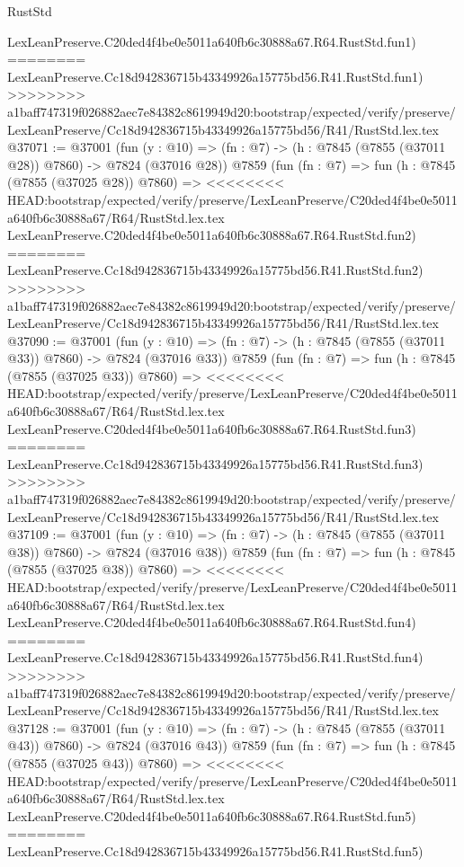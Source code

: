 \begin{lexlean}{RustStd}
\begin{coremodule}
{\begin{coremodule}
{{{{{{{{{{{{{{{{{{{{{{{{{{{{{{{{{{{{{{{{{{{{{{{{{{{{{{    LexLeanPreserve.C20ded4f4be0e5011a640fb6c30888a67.R64.RustStd.fun1)
========
    LexLeanPreserve.Cc18d942836715b43349926a15775bd56.R41.RustStd.fun1)
>>>>>>>> a1baff747319f026882aec7e84382c8619949d20:bootstrap/expected/verify/preserve/LexLeanPreserve/Cc18d942836715b43349926a15775bd56/R41/RustStd.lex.tex
@37071 := @37001
    (fun (y : @10) => (fn : @7) -> (h : @7845 (@7855 (@37011 @28)) @7860) -> @7824 (@37016 @28))
    @7859
    (fun (fn : @7) =>
    fun (h : @7845 (@7855 (@37025 @28)) @7860) =>
<<<<<<<< HEAD:bootstrap/expected/verify/preserve/LexLeanPreserve/C20ded4f4be0e5011a640fb6c30888a67/R64/RustStd.lex.tex
    LexLeanPreserve.C20ded4f4be0e5011a640fb6c30888a67.R64.RustStd.fun2)
========
    LexLeanPreserve.Cc18d942836715b43349926a15775bd56.R41.RustStd.fun2)
>>>>>>>> a1baff747319f026882aec7e84382c8619949d20:bootstrap/expected/verify/preserve/LexLeanPreserve/Cc18d942836715b43349926a15775bd56/R41/RustStd.lex.tex
@37090 := @37001
    (fun (y : @10) => (fn : @7) -> (h : @7845 (@7855 (@37011 @33)) @7860) -> @7824 (@37016 @33))
    @7859
    (fun (fn : @7) =>
    fun (h : @7845 (@7855 (@37025 @33)) @7860) =>
<<<<<<<< HEAD:bootstrap/expected/verify/preserve/LexLeanPreserve/C20ded4f4be0e5011a640fb6c30888a67/R64/RustStd.lex.tex
    LexLeanPreserve.C20ded4f4be0e5011a640fb6c30888a67.R64.RustStd.fun3)
========
    LexLeanPreserve.Cc18d942836715b43349926a15775bd56.R41.RustStd.fun3)
>>>>>>>> a1baff747319f026882aec7e84382c8619949d20:bootstrap/expected/verify/preserve/LexLeanPreserve/Cc18d942836715b43349926a15775bd56/R41/RustStd.lex.tex
@37109 := @37001
    (fun (y : @10) => (fn : @7) -> (h : @7845 (@7855 (@37011 @38)) @7860) -> @7824 (@37016 @38))
    @7859
    (fun (fn : @7) =>
    fun (h : @7845 (@7855 (@37025 @38)) @7860) =>
<<<<<<<< HEAD:bootstrap/expected/verify/preserve/LexLeanPreserve/C20ded4f4be0e5011a640fb6c30888a67/R64/RustStd.lex.tex
    LexLeanPreserve.C20ded4f4be0e5011a640fb6c30888a67.R64.RustStd.fun4)
========
    LexLeanPreserve.Cc18d942836715b43349926a15775bd56.R41.RustStd.fun4)
>>>>>>>> a1baff747319f026882aec7e84382c8619949d20:bootstrap/expected/verify/preserve/LexLeanPreserve/Cc18d942836715b43349926a15775bd56/R41/RustStd.lex.tex
@37128 := @37001
    (fun (y : @10) => (fn : @7) -> (h : @7845 (@7855 (@37011 @43)) @7860) -> @7824 (@37016 @43))
    @7859
    (fun (fn : @7) =>
    fun (h : @7845 (@7855 (@37025 @43)) @7860) =>
<<<<<<<< HEAD:bootstrap/expected/verify/preserve/LexLeanPreserve/C20ded4f4be0e5011a640fb6c30888a67/R64/RustStd.lex.tex
    LexLeanPreserve.C20ded4f4be0e5011a640fb6c30888a67.R64.RustStd.fun5)
========
    LexLeanPreserve.Cc18d942836715b43349926a15775bd56.R41.RustStd.fun5)
}}}}}}}}}}}}}}}}}}}}}}}}}}}}}}}}}}}}}}}}}}}}}}}}}}}}}}
\end{coremodule}}
\end{coremodule}
\end{lexlean}
